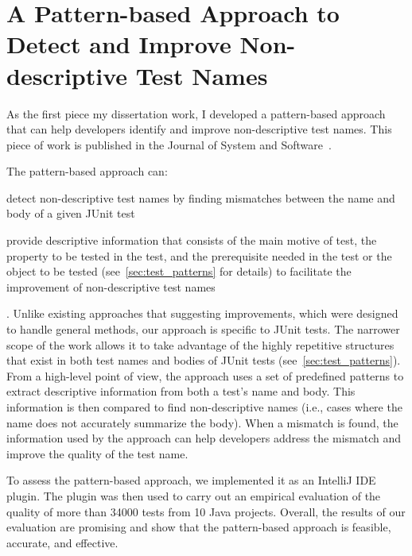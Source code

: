 \section{A Pattern-based Approach to Detect and Improve Non-descriptive Test Names}
\label{sec:test-pattern-section}

As the first piece my dissertation work, I developed a pattern-based approach that can help developers identify and improve non-descriptive test names.
%
This piece of work is published in the Journal of System and Software~\cite{wu2020pattern}.

The pattern-based approach can:
\begin{enumerate*}
\item detect non-descriptive test names by finding mismatches between the name and body of a given JUnit test
\item provide descriptive information that consists of the main motive of test, the property to be tested in the test, and the prerequisite needed in the test or the object to be tested (see~\cref{sec:test_patterns} for details) to facilitate the improvement of non-descriptive test names
\end{enumerate*}.
%
Unlike existing approaches that suggesting improvements, which were designed to handle general methods, our approach is specific to JUnit tests.
The narrower scope of the work allows it to take advantage of the highly repetitive structures that exist in both test names and bodies of JUnit tests (see~\cref{sec:test_patterns}).
%
From a high-level point of view, the approach uses a set of predefined patterns to extract descriptive information from both a test's name and body.
%
This information is then compared to find non-descriptive names (i.e., cases where the name does not accurately summarize the body).
%
When a mismatch is found, the information used by the approach can help developers address the mismatch and improve the quality of the test name.


To assess the pattern-based approach, we implemented it as an IntelliJ IDE plugin.
%
The plugin was then used to carry out an empirical evaluation of the quality of more than \num{34000} tests from \num{10} Java projects.
%
Overall, the results of our evaluation are promising and show that the pattern-based approach is feasible, accurate, and effective.

